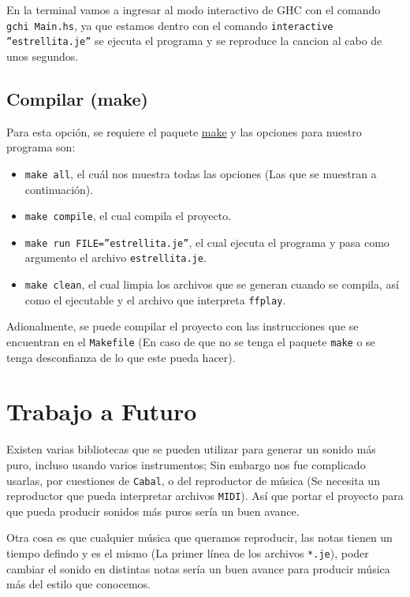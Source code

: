 \documentclass[10pt,a4paper]{article}
\begin{document}
En la terminal vamos a ingresar al modo interactivo de GHC con el comando
\texttt{gchi Main.hs}, ya que estamos dentro con el comando
\texttt{interactive ''estrellita.je''} se ejecuta el programa y se reproduce la
cancion al cabo de unos segundos.

\subsection{Compilar (make)}
Para esta opción, se requiere el paquete
\href{https://www.archlinux.org/packages/core/x86\_64/make/}{make} y las opciones
para nuestro programa son:

\begin{itemize}
\item \texttt{make all}, el cuál nos muestra todas las opciones (Las que se
  muestran a continuación).
\item \texttt{make compile}, el cual compila el proyecto.
\item \texttt{make run FILE=''estrellita.je''}, el cual ejecuta el programa y pasa
  como argumento el archivo \texttt{estrellita.je}.
\item \texttt{make clean}, el cual limpia los archivos que se generan cuando se
  compila, así como el ejecutable y el archivo que interpreta \texttt{ffplay}.
\end{itemize}

Adionalmente, se puede compilar el proyecto con las instrucciones que se
encuentran en el \texttt{Makefile} (En caso de que no se tenga el paquete
\texttt{make} o se tenga desconfianza de lo que este pueda hacer).

\section{Trabajo a Futuro}
Existen varias bibliotecas\cite{paul} que se pueden utilizar para generar un
sonido más puro, incluso usando varios instrumentos; Sin embargo nos fue
complicado usarlas, por cuestiones de \texttt{Cabal}, o del reproductor de música
(Se necesita un reproductor que pueda interpretar archivos \texttt{MIDI}). Así
que portar el proyecto para que pueda producir sonidos más puros sería un buen
avance.

Otra cosa es que cualquier música que queramos reproducir, las notas tienen un
tiempo defindo y es el mismo (La primer línea de los archivos \texttt{*.je}),
poder cambiar el sonido en distintas notas sería un buen avance para producir
música más del estilo que conocemos.
\end{document}
